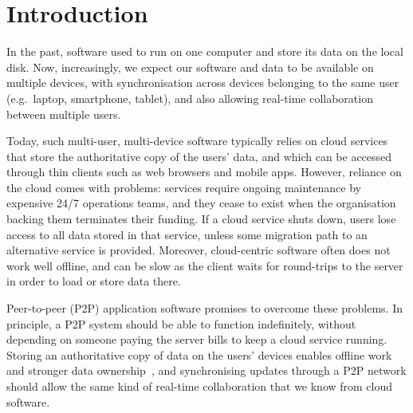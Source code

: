 \documentclass[sigplan,10pt]{acmart}
\begin{document}


\maketitle

\section{Introduction}

In the past, software used to run on one computer and store its data on the local disk.
Now, increasingly, we expect our software and data to be available on multiple devices, with synchronisation across devices belonging to the same user (e.g.\ laptop, smartphone, tablet), and also allowing real-time collaboration between multiple users.

Today, such multi-user, multi-device software typically relies on cloud services that store the authoritative copy of the users' data, and which can be accessed through thin clients such as web browsers and mobile apps.
However, reliance on the cloud comes with problems: services require ongoing maintenance by expensive 24/7 operations teams, and they cease to exist when the organisation backing them terminates their funding.
If a cloud service shuts down, users lose access to all data stored in that service, unless some migration path to an alternative service is provided.
Moreover, cloud-centric software often does not work well offline, and can be slow as the client waits for round-trips to the server in order to load or store data there.

Peer-to-peer (P2P) application software promises to overcome these problems.
In principle, a P2P system should be able to function indefinitely, without depending on someone paying the server bills to keep a cloud service running.
Storing an authoritative copy of data on the users' devices enables offline work and stronger data ownership~\cite{LocalFirst}, and synchronising updates through a P2P network should allow the same kind of real-time collaboration that we know from cloud software.
\end{document}
